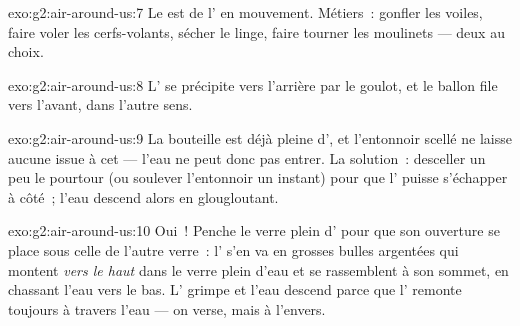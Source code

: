\begin{solution}{exo:g2:air-around-us:7}
Le  est de l' en mouvement. Métiers~: gonfler les voiles,
faire voler les cerfs-volants, sécher le linge, faire tourner les
moulinets --- deux au choix.
\end{solution}

\begin{solution}{exo:g2:air-around-us:8}
L' se précipite vers l'arrière par le goulot, et le ballon file
vers l'avant, dans l'autre sens.
\end{solution}

\begin{solution}{exo:g2:air-around-us:9}
La bouteille est déjà pleine d', et l'entonnoir scellé ne laisse
aucune issue à cet  --- l'eau ne peut donc pas entrer. La
solution~: desceller un peu le pourtour (ou soulever l'entonnoir un
instant) pour que l' puisse s'échapper à côté~; l'eau descend
alors en glougloutant.
\end{solution}

\begin{solution}{exo:g2:air-around-us:10}
Oui~! Penche le verre plein d' pour que son ouverture se place
sous celle de l'autre verre~: l' s'en va en grosses bulles
argentées qui montent \emph{vers le haut} dans le verre plein d'eau
et se rassemblent à son sommet, en chassant l'eau vers le bas. L'
grimpe et l'eau descend parce que l' remonte toujours à travers
l'eau --- on verse, mais à l'envers.
\end{solution}
